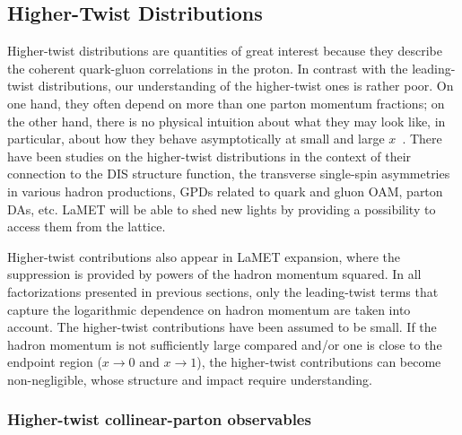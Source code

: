 \subsection{Higher-Twist Distributions}
\label{sec:others-ht}

Higher-twist distributions are quantities of great interest because they describe the coherent quark-gluon correlations in
the proton. In contrast with the leading-twist distributions, our understanding of the higher-twist ones is rather poor.
On one hand, they often depend on more than one parton momentum fractions; on the other hand, there is no physical intuition about what they may look like, in particular, about how they behave asymptotically at small and large $x$~\cite{Braun:2011aw}. There have been studies on the higher-twist distributions in the context of their connection to the DIS structure function, the transverse single-spin asymmetries in various hadron productions, GPDs related to quark and gluon OAM, parton DAs, etc. LaMET will be able to shed new lights by providing a possibility to access them from the lattice.

Higher-twist contributions also appear in LaMET expansion, where
the suppression is provided by powers of the hadron momentum squared.
In all factorizations presented in previous sections, only the leading-twist terms that capture the logarithmic dependence on hadron momentum are taken into account. The higher-twist contributions have been assumed to be small. If the hadron momentum is not sufficiently large compared and/or one is close to the endpoint region ($x\to0$ and $x\to1$), the higher-twist contributions can become non-negligible, whose structure and impact require understanding.


\subsubsection{Higher-twist collinear-parton observables}

